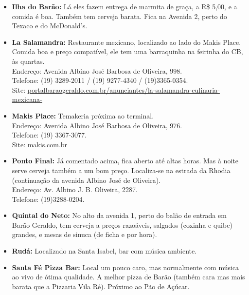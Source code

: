 \begin{itemize}
\item   \textbf{Ilha do Barão:} Lá eles fazem entrega de marmita de graça, a
        R\$ 5,00, e a comida é boa. Também tem cerveja barata. Fica na Avenida
        2, perto do Texaco e do McDonald's.

\item   \textbf{La Salamandra:} Restaurante mexicano, localizado ao lado do
        Makis Place. Comida boa e preço compatível, ele tem uma barraquinha na
        feirinha do CB, às quartas.
        \\Endereço: Avenida Albino José Barbosa de Oliveira, 998.
        \\Telefone: (19) 3289-2011 / (19) 9277-4340 / (19)3365-0354.
        \\Site: \url{portalbaraogeraldo.com.br/anunciantes/la-salamandra-culinaria-mexicana-}

\item   \textbf{Makis Place:} Temakeria próxima ao terminal.
        \\Endereço: Avenida Albino José Barbosa de Oliveira, 976.
        \\Telefone: (19) 3367-3077.
        \\Site: \url{makis.com.br}

\item   \textbf{Ponto Final:} Já comentado acima, fica aberto até altas horas.
        Mas à noite serve cerveja também a um bom preço. Localiza-se na estrada
        da Rhodia (continuação da avenida Albino José de Oliveira).
        \\Endereço: Av. Albino J. B. Oliveira, 2287.
        \\Telefone: (19)3288-0204.

\item   \textbf{Quintal do Neto:} No alto da avenida 1, perto do balão de
        entrada em Barão Geraldo, tem cerveja a preços razoáveis, salgados
        (coxinha e quibe) grandes, e mesas de sinuca (de ficha e por hora).

\item   \textbf{Rudá:} Localizado na Santa Isabel, bar com música ambiente.

\item   \textbf{Santa Fé Pizza Bar:} Local um pouco caro, mas normalmente com
        música ao vivo de ótima qualidade. A melhor pizza de Barão (também cara
        mas mais barata que a Pizzaria Vila Ré). Próximo ao Pão de Açúcar.


\end{itemize}
